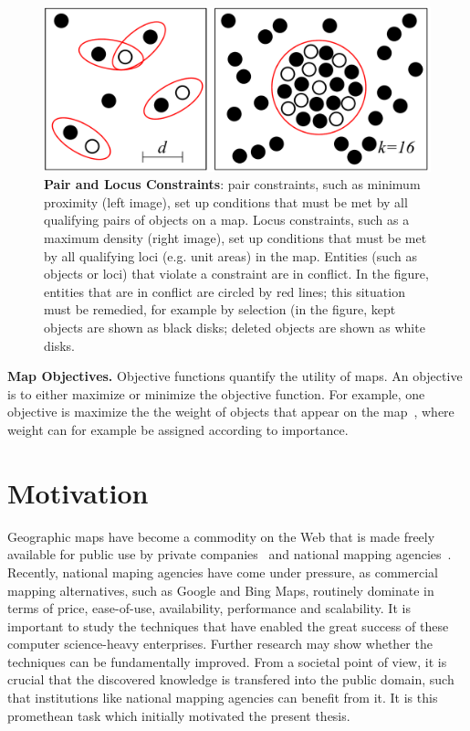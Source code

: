 \documentclass[11pt, oneside]{report}
\newcommand{\minisec}[1]{\noindent\textbf{#1.}}
\begin{document}
{\begin{figure}[htbp]
\begin{center}
\includegraphics[scale=.4]{figs-thesis/holistic-selection.pdf}
\caption{\textbf{Pair and Locus Constraints}: pair constraints, such as minimum proximity (left image), set up conditions that must be met by all qualifying pairs of objects on a map. Locus constraints, such as a maximum density (right image), set up conditions that must be met by all qualifying loci (e.g. unit areas) in the map. Entities (such as objects or loci) that violate a constraint are in conflict. In the figure, entities that are in conflict are circled by red lines; this situation must be remedied, for example by selection (in the figure, kept objects are shown as black disks; deleted objects are shown as white disks.}
\label{fig:introduction:selection:constraints}
\end{center}
\vspace*{-4ex}
\end{figure}

\minisec{Map Objectives}
Objective functions quantify the utility of maps. An objective is to either maximize or minimize the objective function. For example, one objective is maximize the the weight of objects that appear on the map~\cite{sarma2012fusiontables}, where weight can for example be assigned according to importance.


\section{Motivation}
\label{sec:introduction:motivation}
Geographic maps have become a commodity on the Web that is made freely available for public use by private companies~\cite{google2014maps,stamen2014tiles} and national mapping agencies~\cite{gst2014digitalmapsupply}. Recently, national maping agencies have come under pressure, as commercial mapping alternatives, such as Google and Bing Maps, routinely dominate in terms of price, ease-of-use, availability, performance and scalability. It is important to study the techniques that have enabled the great success of these computer science-heavy enterprises. Further research may show whether the techniques can be fundamentally improved. From a societal point of view, it is crucial that the discovered knowledge is transfered into the public domain, such that institutions like national mapping agencies can benefit from it. It is this promethean task which initially motivated the present thesis.

}
\end{document}
